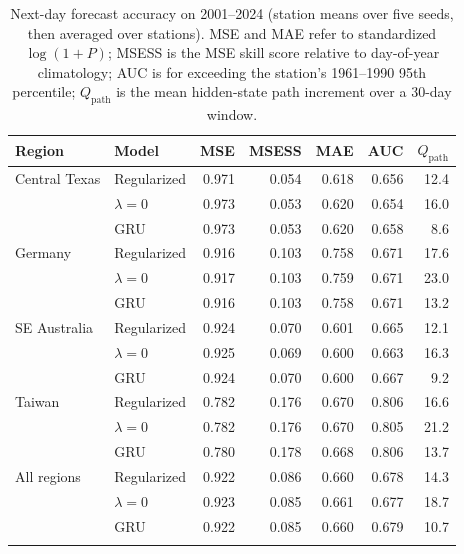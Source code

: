 \begin{table}[tbp]
\caption{Next-day forecast accuracy on 2001--2024 (station means over five seeds, then averaged
over stations). MSE and MAE refer to standardized $\log(1+P)$; MSESS is the MSE skill score relative
to day-of-year climatology; AUC is for exceeding the station's 1961--1990 95th percentile;
$Q_{\mathrm{path}}$ is the mean hidden-state path increment over a 30-day window.}
\label{tab:forecast}
\footnotesize\setlength{\tabcolsep}{4pt}
\begin{tabular*}{\textwidth}{@{\extracolsep\fill}llrrrrr}
\toprule
Region & Model & MSE & MSESS & MAE & AUC & $Q_{\mathrm{path}}$\\
\midrule
Central Texas & Regularized & 0.971 & 0.054 & 0.618 & 0.656 & 12.4 \\
 & $\lambda=0$ & 0.973 & 0.053 & 0.620 & 0.654 & 16.0 \\
 & GRU & 0.973 & 0.053 & 0.620 & 0.658 & 8.6 \\
\midrule
Germany & Regularized & 0.916 & 0.103 & 0.758 & 0.671 & 17.6 \\
 & $\lambda=0$ & 0.917 & 0.103 & 0.759 & 0.671 & 23.0 \\
 & GRU & 0.916 & 0.103 & 0.758 & 0.671 & 13.2 \\
\midrule
SE Australia & Regularized & 0.924 & 0.070 & 0.601 & 0.665 & 12.1 \\
 & $\lambda=0$ & 0.925 & 0.069 & 0.600 & 0.663 & 16.3 \\
 & GRU & 0.924 & 0.070 & 0.600 & 0.667 & 9.2 \\
\midrule
Taiwan & Regularized & 0.782 & 0.176 & 0.670 & 0.806 & 16.6 \\
 & $\lambda=0$ & 0.782 & 0.176 & 0.670 & 0.805 & 21.2 \\
 & GRU & 0.780 & 0.178 & 0.668 & 0.806 & 13.7 \\
\midrule
All regions & Regularized & 0.922 & 0.086 & 0.660 & 0.678 & 14.3 \\
 & $\lambda=0$ & 0.923 & 0.085 & 0.661 & 0.677 & 18.7 \\
 & GRU & 0.922 & 0.085 & 0.660 & 0.679 & 10.7 \\
\botrule
\end{tabular*}
\end{table}

